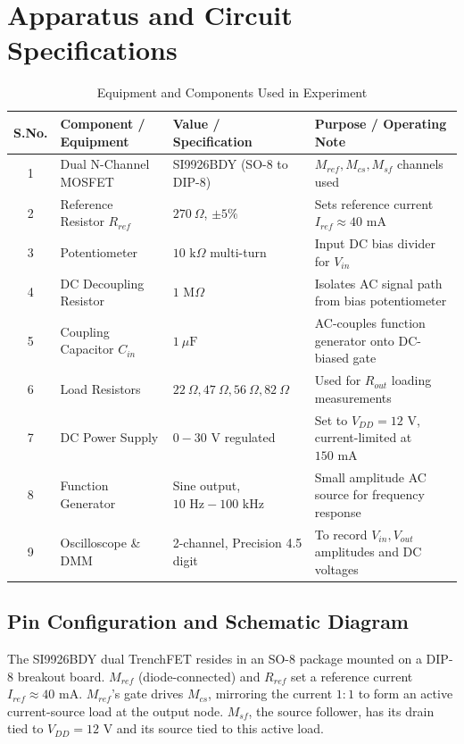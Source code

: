 \documentclass[11pt,a4paper]{article}
\begin{document}
\section{Apparatus and Circuit Specifications}
\begin{table}[H]
\centering
\caption{Equipment and Components Used in Experiment}
\begin{tabular}{@{}cllp{6.5cm}@{}}
\toprule
\textbf{S.No.} & \textbf{Component / Equipment} & \textbf{Value / Specification} & \textbf{Purpose / Operating Note} \\ \midrule
1 & Dual N-Channel MOSFET & SI9926BDY (SO-8 to DIP-8) & $M_{ref}, M_{cs}, M_{sf}$ channels used \\
2 & Reference Resistor $R_{ref}$ & $270\ \Omega$, $\pm 5\%$ & Sets reference current $I_{ref} \approx 40\text{ mA}$ \\
3 & Potentiometer & $10\text{ k}\Omega$ multi-turn & Input DC bias divider for $V_{in}$ \\
4 & DC Decoupling Resistor & $1\text{ M}\Omega$ & Isolates AC signal path from bias potentiometer \\
5 & Coupling Capacitor $C_{in}$ & $1\ \mu\text{F}$ & AC-couples function generator onto DC-biased gate \\
6 & Load Resistors & $22\ \Omega, 47\ \Omega, 56\ \Omega, 82\ \Omega$ & Used for $R_{out}$ loading measurements \\
7 & DC Power Supply & $0-30\text{ V}$ regulated & Set to $V_{DD} = 12\text{ V}$, current-limited at $150\text{ mA}$ \\
8 & Function Generator & Sine output, $10\text{ Hz} - 100\text{ kHz}$ & Small amplitude AC source for frequency response \\
9 & Oscilloscope \& DMM & 2-channel, Precision 4.5 digit & To record $V_{in}, V_{out}$ amplitudes and DC voltages \\
\bottomrule
\end{tabular}
\end{table}

\subsection{Pin Configuration and Schematic Diagram}
The SI9926BDY dual TrenchFET resides in an SO-8 package mounted on a DIP-8 breakout board. 
$M_{ref}$ (diode-connected) and $R_{ref}$ set a reference current $I_{ref} \approx 40\text{ mA}$. $M_{ref}$'s gate drives $M_{cs}$, mirroring the current $1:1$ to form an active current-source load at the output node. $M_{sf}$, the source follower, has its drain tied to $V_{DD} = 12\text{ V}$ and its source tied to this active load.
\end{document}
